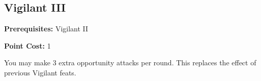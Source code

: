 \subsection*{Vigilant III}\label{feat:vigilant3}

\noindent
\textbf{Prerequisites:} Vigilant II

\noindent
\textbf{Point Cost:} 1

You may make 3 extra opportunity attacks per round. This replaces the effect
of previous Vigilant feats.
